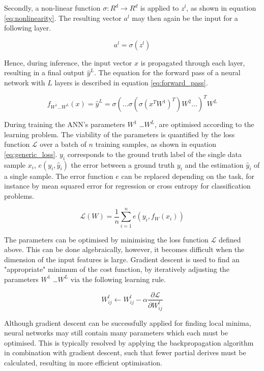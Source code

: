 Secondly, a non-linear function $\sigma: R^d \rightarrow R^d$ is applied to $z^{l}$, as shown in equation \ref{eq:nonlinearity}. The resulting vector $a^l$ may then again be the input for a following layer.

\begin{equation}
	a^l = \sigma(z^{l})	\label{eq:nonlinearity}
\end{equation}

Hence, during inference, the input vector $x$ is propagated through each layer, resulting in a final output $\hat{y}^L$. The equation for the forward pass of a neural network with $L$ layers is described in equation \ref{eq:forward_pass}. 

\begin{equation}
	f_{W^1 \dots W^L}(x) = \hat{y}^L = \sigma(… \sigma( \sigma( x^T W^1 )^T) W^2 …)^T W^L \label{eq:forward_pass}
\end{equation}

During training the ANN's parameters $W^1$ \dots $W^L$, are optimised according to the learning problem. The viability of the parameters is quantified by the loss function $\mathcal{L}$ over a batch of $n$ training samples, as shown in equation \ref{eq:generic_loss}. $y_i$ corresponds to the ground truth label of the single data sample $x_i$, $e(y_i, \hat{y}_i)$ the error between a ground truth $y_i$ and the estimation $\hat{y}_i$ of a single sample. The error function $e$ can be replaced depending on the task, for instance by mean squared error for regression or cross entropy for classification problems.

\begin{equation}
	\mathcal{L}(W) = \frac{1}{n}\sum_{i=1}^n e(y_i, f_{W}(x_i)) \label{eq:generic_loss}
\end{equation}

The parameters can be optimised by minimising the loss function $\mathcal{L}$ defined above. This can be done algebraically, however, it becomes difficult when the dimension of the input features is large. Gradient descent is used to find an "appropriate" minimum of the cost function, by iteratively adjusting the parameters $W^1$ \dots $W^L$ via the following learning rule.

\begin{equation}
	W^l_{ij} \leftarrow W^l_{ij} - \alpha \frac{\partial \mathcal{L}}{\partial W^l_{ij}}
\end{equation}

Although gradient descent can be successfully applied for finding local minima, neural networks may still contain many parameters which each must be optimised. This is typically resolved by applying the backpropagation algorithm in combination with gradient descent, such that fewer partial derives must be calculated, resulting in more efficient optimisation.


